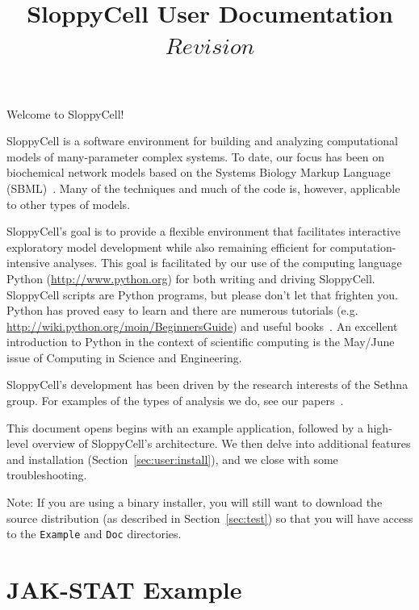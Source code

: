 \documentclass[12pt]{article}
\newcommand{\shell}[1]{\lstinline[language=csh, showstringspaces=False]!#1!}
\begin{document}
\title{SloppyCell User Documentation\\
\large$Revision$}
\maketitle
\tableofcontents
\clearpage

Welcome to SloppyCell!

SloppyCell is a software environment for building and analyzing computational models of many-parameter complex systems.
To date, our focus has been on biochemical network models based on the Systems Biology Markup Language (SBML)~\cite{bib:Hucka2003}.
Many of the techniques and much of the code is, however, applicable to other types of models.

SloppyCell's goal is to provide a flexible environment that facilitates interactive exploratory model development while also remaining efficient for computation-intensive analyses.
This goal is facilitated by our use of the computing language Python (\url{http://www.python.org}) for both writing and driving SloppyCell.
SloppyCell scripts are Python programs, but please don't let that frighten you.
Python has proved easy to learn and there are numerous tutorials (e.g. \url{http://wiki.python.org/moin/BeginnersGuide}) and useful books~\cite{bib:Lutz2003}.
An excellent introduction to Python in the context of scientific computing is the May/June issue of Computing in Science and Engineering.

SloppyCell's development has been driven by the research interests of the Sethna group. For examples of the types of analysis we do, see our papers~\cite{bib:Brown2003a, bib:Brown2004, bib:Frederiksen2004, bib:Waterfall2006, bib:Casey2007, bib:Gutenkunst2007, bib:Gutenkunst2007a, bib:GutenkunstPhD}.

This document opens begins with an example application, followed by a high-level overview of SloppyCell's architecture.
We then delve into additional features and installation (Section~\ref{sec:user:install}), and we close with some troubleshooting.

Note: If you are using a binary installer, you will still want to download the source distribution (as described in Section~\ref{sec:test}) so that you will have access to the \shell{Example} and \shell{Doc} directories.

\section{JAK-STAT Example\label{sec:user:example}}
\end{document}
